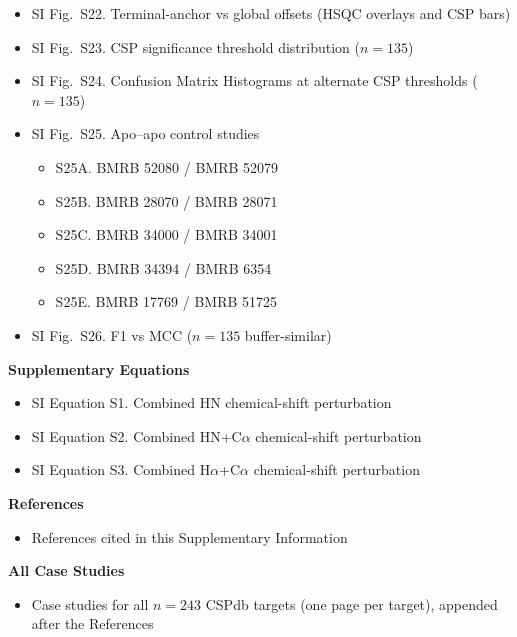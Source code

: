 \documentclass[11pt]{article}
\begin{document}
\begin{itemize}[label={}]
\item SI Fig.\ S22. Terminal-anchor vs global offsets (HSQC overlays and CSP bars)
\item SI Fig.\ S23. CSP significance threshold distribution ($n=135$)
\item SI Fig.\ S24. Confusion Matrix Histograms at alternate CSP thresholds ($n=135$)
\item SI Fig.\ S25. Apo--apo control studies
\begin{itemize}[leftmargin=1.8em,label={},itemsep=0.05em,parsep=0pt,topsep=0.12em]
\item S25A. BMRB 52080 / BMRB 52079
\item S25B. BMRB 28070 / BMRB 28071
\item S25C. BMRB 34000 / BMRB 34001
\item S25D. BMRB 34394 / BMRB 6354
\item S25E. BMRB 17769 / BMRB 51725
\end{itemize}
\item SI Fig.\ S26. F1 vs MCC ($n=135$ buffer-similar)
\end{itemize}

\vspace{0.6em}
\noindent\textbf{Supplementary Equations}\\[0.3em]
\begin{itemize}[label={}]
\item SI Equation S1. Combined HN chemical-shift perturbation
\item SI Equation S2. Combined HN+C$\alpha$ chemical-shift perturbation
\item SI Equation S3. Combined H$\alpha$+C$\alpha$ chemical-shift perturbation
\end{itemize}

\vspace{0.6em}
\noindent\textbf{References}\\[0.3em]
\begin{itemize}[label={}]
\item References cited in this Supplementary Information
\end{itemize}

\vspace{0.6em}
\noindent\textbf{All Case Studies}\\[0.3em]
\begin{itemize}[label={}]
\item Case studies for all $n=243$ CSPdb targets (one page per target), appended after the References
\end{itemize}
\end{document}
